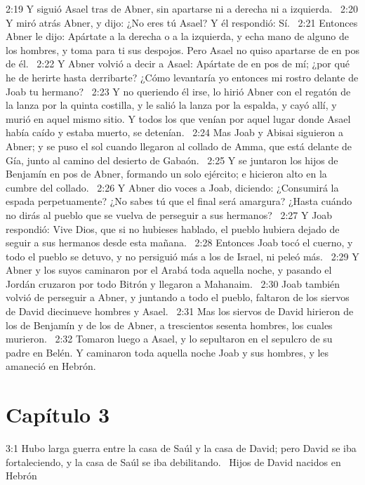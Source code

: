 2:19 Y siguió Asael tras de Abner, sin apartarse ni a derecha ni a izquierda.  
2:20 Y miró atrás Abner, y dijo: ¿No eres tú Asael? Y él respondió: Sí.  
2:21 Entonces Abner le dijo: Apártate a la derecha o a la izquierda, y echa mano de alguno de los hombres, y toma para ti sus despojos. Pero Asael no quiso apartarse de en pos de él.  
2:22 Y Abner volvió a decir a Asael: Apártate de en pos de mí; ¿por qué he de herirte hasta derribarte? ¿Cómo levantaría yo entonces mi rostro delante de Joab tu hermano?  
2:23 Y no queriendo él irse, lo hirió Abner con el regatón de la lanza por la quinta costilla, y le salió la lanza por la espalda, y cayó allí, y murió en aquel mismo sitio. Y todos los que venían por aquel lugar donde Asael había caído y estaba muerto, se detenían.  
2:24 Mas Joab y Abisai siguieron a Abner; y se puso el sol cuando llegaron al collado de Amma, que está delante de Gía, junto al camino del desierto de Gabaón.  
2:25 Y se juntaron los hijos de Benjamín en pos de Abner, formando un solo ejército; e hicieron alto en la cumbre del collado.  
2:26 Y Abner dio voces a Joab, diciendo: ¿Consumirá la espada perpetuamente? ¿No sabes tú que el final será amargura? ¿Hasta cuándo no dirás al pueblo que se vuelva de perseguir a sus hermanos?  
2:27 Y Joab respondió: Vive Dios, que si no hubieses hablado, el pueblo hubiera dejado de seguir a sus hermanos desde esta mañana.  
2:28 Entonces Joab tocó el cuerno, y todo el pueblo se detuvo, y no persiguió más a los de Israel, ni peleó más.  
2:29 Y Abner y los suyos caminaron por el Arabá toda aquella noche, y pasando el Jordán cruzaron por todo Bitrón y llegaron a Mahanaim.  
2:30 Joab también volvió de perseguir a Abner, y juntando a todo el pueblo, faltaron de los siervos de David diecinueve hombres y Asael.  
2:31 Mas los siervos de David hirieron de los de Benjamín y de los de Abner, a trescientos sesenta hombres, los cuales murieron.  
2:32 Tomaron luego a Asael, y lo sepultaron en el sepulcro de su padre en Belén. Y caminaron toda aquella noche Joab y sus hombres, y les amaneció en Hebrón. 
\section*{Capítulo 3 }

3:1 Hubo larga guerra entre la casa de Saúl y la casa de David; pero David se iba fortaleciendo, y la casa de Saúl se iba debilitando.  
Hijos de David nacidos en Hebrón  

